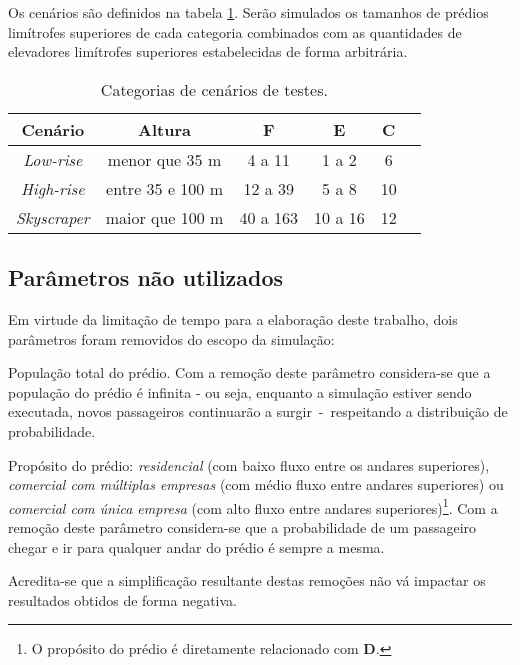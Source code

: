 Os cenários são definidos na tabela \ref{tab:cenarios}. Serão simulados os
tamanhos de prédios limítrofes superiores de cada categoria combinados com as
quantidades de elevadores limítrofes superiores estabelecidas de forma
arbitrária.

\begin{table}[htb!]
\centering
\caption{Categorias de cenários de testes.}
\label{tab:cenarios}
\begin{tabular}{|c|c|c|c|c|c|}
\hline
{\bf Cenário} & {\bf Altura} & {\bf F}  & {\bf E} & {\bf C}
\\ \hline
{\it Low-rise}   & menor que 35 m    & 4 a 11         & 1 a 2   & 6  \\ \hline
{\it High-rise}  & entre 35 e 100 m  & 12 a 39        & 5 a 8   & 10 \\ \hline
{\it Skyscraper} & maior que 100 m   & 40 a 163       & 10 a 16 & 12 \\ \hline
\end{tabular}
\end{table}

\subsection{Parâmetros não utilizados}

Em virtude da limitação de tempo para a elaboração deste trabalho, dois
parâmetros foram removidos do escopo da simulação:

\begin{description}[leftmargin=!,labelwidth=\widthof{\bfseries Pu}]
  \item[P]
  População total do prédio. Com a remoção deste parâmetro considera-se que a
  população do prédio é infinita - ou seja, enquanto a simulação estiver sendo
  executada, novos passageiros continuarão a surgir~-~respeitando a distribuição
  de probabilidade.

  \item[Pu]
  Propósito do prédio: \textit{residencial} (com baixo fluxo entre os andares
  superiores), \textit{comercial com múltiplas empresas} (com médio fluxo entre
  andares superiores) ou \textit{comercial com única empresa} (com alto fluxo
  entre andares superiores)\footnote{O propósito do prédio é diretamente
  relacionado com \textbf{D}.}. Com a remoção deste parâmetro considera-se que
  a probabilidade de um passageiro chegar e ir para qualquer andar do prédio é
  sempre a mesma.
\end{description}

Acredita-se que a simplificação resultante destas remoções não vá impactar os
resultados obtidos de forma negativa.
